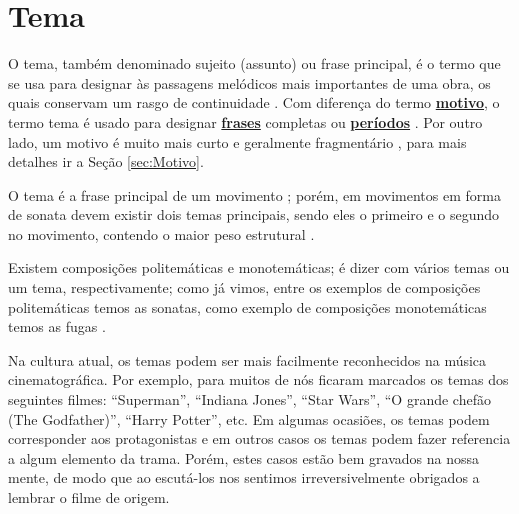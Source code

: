 \section{Tema}
\label{sec:tema}

O tema, também denominado sujeito (assunto) ou frase principal,
é o termo que se usa para designar às passagens melódicos mais importantes de uma obra, 
os quais conservam um rasgo de continuidade \cite[pp. 411]{stainer2009dictionary} \cite[pp. 1496]{latham2008diccionario}.
Com diferença do termo \hyperref[sec:Motivo]{\textbf{motivo}},
o termo tema é usado para designar \hyperref[sec:Frase]{\textbf{frases}} completas 
ou \hyperref[sec:Periodo]{\textbf{períodos}} \cite[pp. 1496]{latham2008diccionario}.
Por outro lado, um motivo é muito mais curto e geralmente fragmentário \cite[pp. 545]{apel1969harvard},
para mais detalhes ir a Seção \ref{sec:Motivo}.

O tema é a frase principal de um movimento \cite[pp. 411]{stainer2009dictionary};
porém, em movimentos em forma de sonata 
devem existir dois  temas principais, sendo eles o primeiro e o segundo no movimento, 
contendo o maior peso estrutural \cite[pp. 411]{stainer2009dictionary} \cite[pp. 1496]{latham2008diccionario}.

Existem composições politemáticas e monotemáticas;
é dizer com vários temas ou um tema, respectivamente; 
como já vimos, entre os exemplos de composições politemáticas
temos as sonatas, como exemplo de composições monotemáticas temos as fugas \cite[pp. 539]{apel1969harvard}.

\begin{example}
Na cultura atual, os temas podem ser mais facilmente reconhecidos  na música cinematográfica.
Por exemplo, para muitos de nós ficaram marcados os temas dos seguintes filmes: ``Superman'', ``Indiana Jones'',
``Star Wars'', ``O grande chefão (The Godfather)'', ``Harry Potter'', etc.
Em algumas ocasiões, os temas podem corresponder aos protagonistas 
e em outros casos os temas podem fazer referencia a algum elemento da trama.
Porém, estes casos estão bem gravados na nossa mente, 
de modo que ao escutá-los nos sentimos irreversivelmente obrigados a lembrar o filme de origem.
\end{example}
